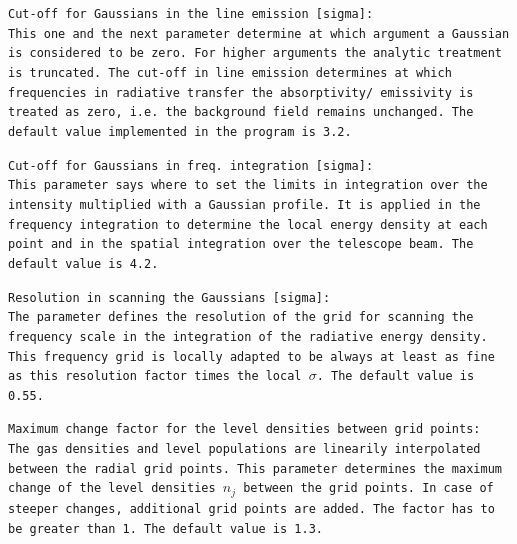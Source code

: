 \begin{description}
\item{}\tt Cut-off for Gaussians in the line emission [sigma]:\\ \rm
This one and the next parameter determine at which argument
a Gaussian is considered to be zero. For higher arguments
the analytic treatment is truncated. The cut-off in line emission
determines at which frequencies in radiative transfer the absorptivity/
emissivity is treated as zero, i.e. the background field remains unchanged.
The default value implemented in the program is 3.2. 
\item{}\tt Cut-off for Gaussians in freq.\ integration [sigma]:\\ \rm
This parameter says where to set the limits in integration over
the intensity multiplied with a Gaussian profile. It is applied in
the frequency integration to determine the local energy density at each 
point and in the spatial integration over the telescope beam.
The default value is 4.2.
\item{}\tt Resolution in scanning the Gaussians [sigma]:\\ \rm
The parameter defines the resolution of the grid for scanning the
frequency scale in the integration of the radiative energy density. 
This frequency grid is locally adapted to be always
at least as fine as this resolution factor times the local $\sigma$.
The default value is 0.55.
\item{}\tt Maximum change factor for the level densities between grid points:
\\ \rm
The gas densities and level populations are linearily interpolated 
between the radial grid points. This parameter determines the maximum 
change of the level densities $n_j$ between the grid points. In case of
steeper changes, additional grid points are added. The factor has to be 
greater than 1. The default value is 1.3.


\end{description}
